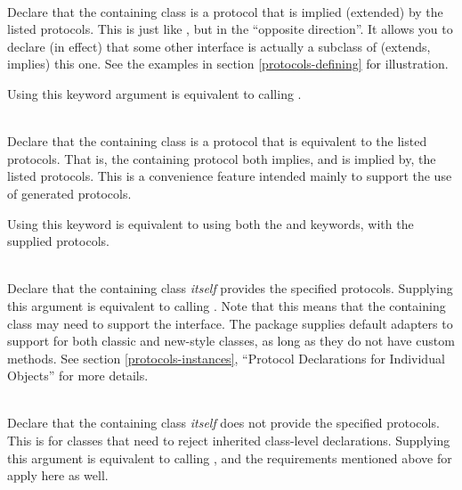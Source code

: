 \begin{verbatim%
}
\begin{verbatim%
}
\begin{verbatim%
}
\begin{verbatim%
}
\begin{verbatim%
}
\begin{verbatim%
}
\begin{description}
\begin{verbatim%
}
\item[protocolIsSubsetOf = \var{protocols}] \hfill \\
Declare that the containing class is a protocol that is implied (extended) by
the listed protocols.  This is just like , but in the
``opposite direction''.  It allows you to declare (in effect) that some other
interface is actually a subclass of (extends, implies) this one.  See the
examples in section \ref{protocols-defining} for illustration.

Using this keyword argument is equivalent to calling
.

\item[equivalentProtocols = \var{protocols}] \hfill \\
Declare that the containing class is a protocol that is equivalent to the
listed protocols.  That is, the containing protocol both implies, and is implied
by, the listed protocols.  This is a convenience feature intended mainly to
support the use of generated protocols.

Using this keyword is equivalent to using both the  and
 keywords, with the supplied protocols.

\item[classProvides = \var{protocols}] \hfill \\
Declare that the containing class \emph{itself} provides the specified
protocols.  Supplying this argument is equivalent to calling
.  Note that this
means that the containing class may need to support the 
interface.  The  package supplies default adapters to
support  for both classic and new-style classes, as long
as they do not have custom  methods.  See section
\ref{protocols-instances}, ``Protocol Declarations for Individual Objects''
for more details.

\item[classDoesNotProvide = \var{protocols}] \hfill \\
Declare that the containing class \emph{itself} does not provide the specified
protocols.  This is for classes that need to reject inherited class-level
 declarations.  Supplying this argument is equivalent to
calling , and the  requirements
mentioned above for  apply here as well.



\end{verbatim%
}
\end{description}
\end{verbatim%
}
\end{verbatim%
}
\end{verbatim%
}
\end{verbatim%
}
\end{verbatim%
}
\end{verbatim%
}
